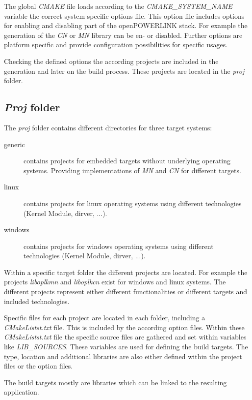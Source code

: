 The global \emph{CMAKE} file loads according to the \emph{CMAKE\_SYSTEM\_NAME} variable the correct system specific options file.
This option file includes options for enabling and disabling part of the openPOWERLINK stack.
For example the generation of the \emph{CN} or \emph{MN} library can be en- or disabled.
Further options are platform specific and provide configuration possibilities for specific usages.

Checking the defined options the according projects are included in the generation and later on the build process.
These projects are located in the \emph{proj} folder.


\subsection{\emph{Proj} folder}
\label{sec:oplk_structure_proj}
The \emph{proj} folder contains different directories for three target systems:

\begin{description}
    \item[generic] contains projects for embedded targets without underlying operating systems.
    Providing implementations of \emph{MN} and \emph{CN} for different targets.
    \item[linux] contains projects for linux operating systems using different technologies (Kernel Module, dirver, ...).
    \item[windows] contains projects for windows operating systems using different technologies (Kernel Module, dirver, ...).
\end{description}

Within a specific target folder the different projects are located.
For example the projects \emph{liboplkmn} and \emph{liboplkcn} exist for windows and linux systems.
The different projects represent either different functionalities or different targets and included technologies.

Specific files for each project are located in each folder, including a \emph{CMakeListst.txt} file.
This is included by the according option files.
Within these \emph{CMakeListst.txt} file the specific source files are gathered and set within variables like \emph{LIB\_SOURCES}.
These variables are used for defining the build targets.
The type, location and additional libraries are also either defined within the project files or the option files.

The build targets mostly are libraries which can be linked to the resulting application.

